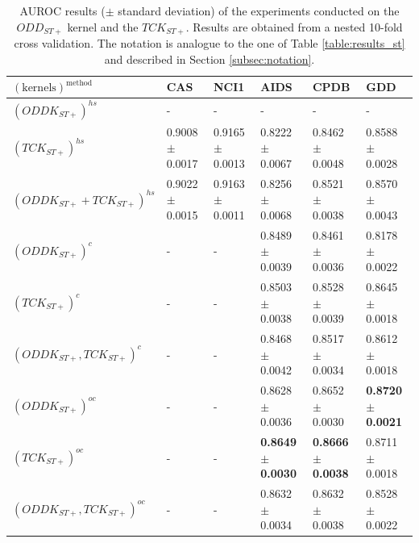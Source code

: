 \begin{landscape}
\begin{table}[ht]
        \begin{tabular}{|l|l|l|l|l|l|}
            \hline
            $\mathrm{(kernels)^{method}}$&CAS&NCI1&AIDS&CPDB&GDD\\
            \hline
            $(ODDK_{ST+})^{hs}$&-&-&-&-&-\\
            $(TCK_{ST+})^{hs}$&0.9008 $\pm$ 0.0017&0.9165 $\pm$ 0.0013&0.8222 $\pm$ 0.0067&0.8462 $\pm$ 0.0048&0.8588 $\pm$ 0.0028\\
            $(ODDK_{ST+} + TCK_{ST+})^{hs}$&0.9022 $\pm$ 0.0015 &0.9163 $\pm$ 0.0011&0.8256 $\pm$ 0.0068&0.8521 $\pm$ 0.0038&0.8570 $\pm$ 0.0043\\
            \hline
            $(ODDK_{ST+})^c$&-&-&0.8489 $\pm$  0.0039&0.8461 $\pm$ 0.0036&0.8178 $\pm$ 0.0022\\
            $(TCK_{ST+})^c$&-&-&0.8503 $\pm$  0.0038&0.8528 $\pm$ 0.0039&0.8645 $\pm$ 0.0018\\
            $(ODDK_{ST+}, TCK_{ST+})^c$&-&-&0.8468 $\pm$ 0.0042&0.8517 $\pm$ 0.0034&0.8612 $\pm$ 0.0018\\
            \hline
            $(ODDK_{ST+})^{oc}$&-&-&0.8628 $\pm$  0.0036&0.8652 $\pm$ 0.0030&\textbf{0.8720 $\pm$ 0.0021}\\
            $(TCK_{ST+})^{oc}$&-&-&\textbf{0.8649 $\pm$  0.0030}&\textbf{0.8666 $\pm$  0.0038}&0.8711 $\pm$ 0.0018 \\
            $(ODDK_{ST+}, TCK_{ST+})^{oc}$&-&-&0.8632 $\pm$  0.0034&0.8632 $\pm$  0.0038&0.8528 $\pm$ 0.0022\\
            \hline
        \end{tabular}
        \caption{AUROC results ($\pm$ standard deviation) of the experiments conducted on
                the $ODD_{ST+}$ kernel and the $TCK_{ST+}$. Results are
                obtained from a nested 10-fold cross validation.
                The notation is analogue to the one of Table \ref{table:results_st} and described in Section \ref{subsec:notation}.}
        \label{table:results_stp}
    \end{table}

    \begin{table}[ht]
        \label{table:results_wl}


\end{table}
\end{landscape}
